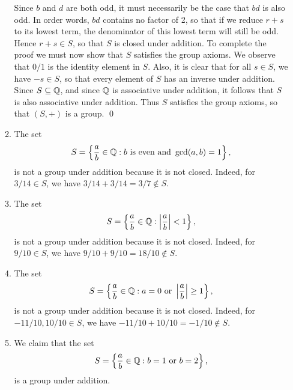 \begin{enumerate}
\begin{enumerate}
               Since $b$ and $d$ are both odd, it must necessarily be the case 
               that $bd$ is also odd. In order words, $bd$ contains no factor of 
               2, so that if we reduce $r + s$ to its lowest term, the 
               denominator of this lowest term will still be odd. Hence
               $r + s \in S$, so that $S$ is closed under addition. To complete 
               the proof we must now show that $S$ satisfies the group axioms. 
               We observe that $0/1$ is the identity element in $S$. Also, it is 
               clear that for all $s \in S$, we have $-s \in S$, so that every 
               element of $S$ has an inverse under addition. Since
               $S \subseteq \mathbb{Q}$, and since $\mathbb{Q}$ is associative under addition, 
               it follows that $S$ is also associative under addition. Thus $S$ 
               satisfies the group axioms, so that $(S, +)$ is a group. \qed
         \item The set
               $$S = \left\{\frac{a}{b} \in \mathbb{Q} : b \text{ is even} \text{ and }
                 \gcd(a, b) = 1\right\},$$
               is not a group under addition because it is not closed. Indeed,
               for $3/14 \in S$, we have $3/14 + 3/14 = 3/7 \notin S$.
         \item The set
               $$S = \left\{\frac{a}{b} \in \mathbb{Q} :
                     \left|\frac{a}{b}\right| < 1\right\},$$
               is not a group under addition because it is not closed. Indeed,
               for $9/10 \in S$, we have $9/10 + 9/10 = 18/10 \notin S$.
         \item The set
               $$S = \left\{\frac{a}{b} \in \mathbb{Q} : a = 0 \text{ or }
                     \left|\frac{a}{b}\right| \ge 1\right\},$$
               is not a group under addition because it is not closed. Indeed,
               for $-11/10, 10/10 \in S$, we have
               $-11/10 + 10/10 = -1/10 \notin S$.
         \item We claim that the set
               $$S = \left\{\frac{a}{b} \in \mathbb{Q} : b = 1 \text{ or }
                 b = 2\right\},$$
               is a group under addition.


\end{enumerate}
\end{enumerate}
